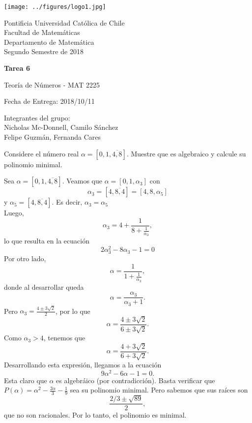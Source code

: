 


\begin{minipage}{2.5cm}
	\texttt{[image: ../figures/logo1.jpg]}
\end{minipage}
\begin{minipage}{13cm}
	\begin{flushleft}
		\raggedright
		{
			\noindent
			{\sc Pontificia Universidad Católica de Chile\\
				Facultad de Matemáticas\\
				Departamento de Matemática} \smallskip \\
			Segundo Semestre de 2018\\
		}
	\end{flushleft}
\end{minipage}

\vspace{2ex}
{\Large \centerline{\bf Tarea 6}}
{\large \centerline{Teoría de Números - MAT 2225}}
\centerline{Fecha de Entrega: 2018/10/11}

\begin{flushright}
	Integrantes del grupo:\\
	Nicholas Mc-Donnell, Camilo Sánchez\\
	Felipe Guzmán, Fernanda Cares
\end{flushright}

\begin{prob}[5 pts.]
	Considere el número real $\alpha=[0,1,\overline{4,8}]$. Muestre que es algebraico y calcule su polinomio minimal.
\end{prob}

\begin{sol}
	Sea $\alpha = [0, 1, \overline{4, 8}]$. Veamos que $\alpha = [0, 1, \alpha_3]$ con
	$$\alpha_3 = [4, \overline{8, 4}] = [4, 8, \alpha_5]$$
	y $\alpha_5 = [4, \overline{8, 4}]$. Es decir, $\alpha_3 = \alpha_5$ \\
	Luego,
	$$\alpha_3 = 4 + \frac{1}{8 + \frac{1}{\alpha_3}},$$
	lo que resulta en la ecuación
	$$2\alpha_3^2 - 8\alpha_3 - 1 = 0$$
	Por otro lado, $$\alpha = \frac{1}{1 + \frac{1}{\alpha_3}},$$
	donde al desarrollar queda
	$$\alpha = \frac{\alpha_3}{\alpha_3 + 1}.$$
	Pero $\alpha_3 = \frac{4 \pm 3 \sqrt{2}}{2}$, por lo que
	$$\alpha = \frac{4 \pm 3 \sqrt{2}}{6 \pm 3 \sqrt{2}}.$$
	Como $\alpha_3 > 4$, tenemos que
	$$\alpha = \frac{4 + 3 \sqrt{2}}{6 + 3 \sqrt{2}}.$$
	Desarrollando esta expresión, llegamos a la ecuación
	$$9\alpha^2 - 6\alpha - 1 = 0.$$
	Esta claro que $\alpha$ es algebráico (por contradicción). Basta verificar que $P(\alpha) = \alpha^2 - \frac{2 \alpha}{3} - \frac{1}{9}$ sea su polinomio minimal. Pero sabemos que sus raíces son $$\frac{2/3 \pm \sqrt{89}}{2},$$
	que no son racionales. Por lo tanto, el polinomio es minimal.
\end{sol}

